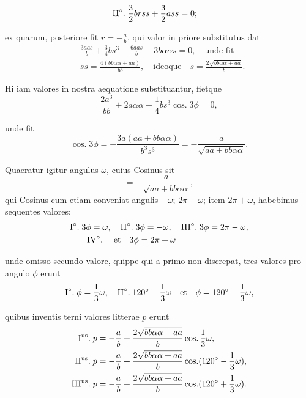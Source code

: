 \documentclass[10pt,a4paper]{article}
\DeclareMathOperator{\cosg}{cos.}
\begin{document}
\begin{paracol}{2}
\begin{enumerate}[topsep=1px]
\begin{align*}
			\text{II}\degree.\;& \frac{3}{2}brss+\frac{3}{2}ass = 0;
		\end{align*}
		\par ex quarum, posteriore fit $r=-\frac{a}{b}$, qui valor in priore substitutus dat
		\begin{align*}
			&\frac{3aas}{b}+\frac{3}{4}bs^3-\frac{6aas}{b}-3b\alpha \alpha s = 0, \quad \text{unde fit}\\
			&ss = \frac{4(bb\alpha \alpha + aa)}{bb}, \quad \text{ideoque} \quad s = \frac{2\sqrt{bb\alpha \alpha + aa}}{b}.
		\end{align*}
		\par Hi iam valores in nostra aequatione substituantur, fietque
		\[
			\frac{2a^3}{bb}+2a\alpha \alpha + \frac{1}{4}bs^3\cosg 3\phi = 0,
		\]
		\par unde fit
		\[
			\cosg 3\phi = - \frac{3a(aa + bb\alpha \alpha)}{b^3s^3} =-\frac{a}{\sqrt{aa+bb\alpha \alpha}}.
		\]
		\par Quaeratur igitur angulus $\omega$, cuius Cosinus sit
		\[
			= -\frac{a}{\sqrt{aa+bb\alpha \alpha}},
		\]
		qui Cosinus cum etiam conveniat angulis $-\omega$; $2\pi - \omega$; item $2\pi + \omega$, habebimus sequentes valores:
		\begin{align*}
			&\text{I}\degree.\;3\phi = \omega, \quad \text{II}\degree.\; 3\phi = -\omega, \quad \text{III}\degree.\; 3\phi = 2\pi - \omega, \\
			&\qquad \text{IV}\degree.\; \quad \text{et} \quad 3\phi = 2\pi+\omega
		\end{align*}
		\par unde omisso secundo valore, quippe qui a primo non discrepat, tres valores pro angulo $\phi$ erunt
		\[
			\text{I}\degree.\; \phi = \frac{1}{3}\omega, \quad \text{II}\degree.\; 120\degree - \frac{1}{3}\omega \quad \text{et}\quad  \phi = 120\degree +\frac{1}{3}\omega,
		\]
		\par quibus inventis terni valores litterae $p$ erunt
		\begin{align*}
			\text{I\textsuperscript{us}.}\;  p &= -\frac{a}{b}+\frac{2\sqrt{bb\alpha \alpha + aa}}{b} \cosg \frac{1}{3} \omega,\\
			\text{II\textsuperscript{us}.}\; p &= -\frac{a}{b}+\frac{2\sqrt{bb\alpha \alpha + aa}}{b} \cosg (120\degree - \frac{1}{3}\omega),\\
			\text{III\textsuperscript{us}.}\; p & = -\frac{a}{b}+\frac{2\sqrt{bb\alpha \alpha+aa}}{b} \cosg (120\degree + \frac{1}{3}\omega).
		\end{align*}
		

\end{enumerate}
\end{paracol}
\end{document}
